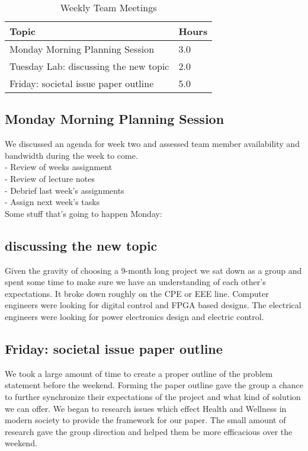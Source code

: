 \documentclass[12pt,article,compsoc]{IEEEtran}
\begin{document}
	
	\begin{table}[ht]
		\renewcommand{\arraystretch}{1.3}
			\caption{Weekly Team Meetings}
			
			\label{Team Hour Summary}
			
			\centering
			\begin{tabular}{p{7cm}|p{1cm}}
			\hline
			\bfseries 	Topic 										& \bfseries Hours\\
			\hline\hline
						Monday Morning Planning Session				& 3.0					\\
						Tuesday Lab: discussing the new topic 		& 2.0					\\	
						Friday: societal issue paper outline		& 5.0					\\	
			\hline
			\end{tabular}
		\end{table}
		 
	\subsection{Monday Morning Planning Session}
		We discussed an agenda for week two and assessed team member availability and bandwidth during the week to come. \\
		-	Review of weeks assignment				\\
		-	Review of lecture notes					\\
		-	Debrief last week’s assignments			\\
		-	Assign next week’s tasks				\\
		Some stuff that’s going to happen Monday:
		
	\subsection{discussing the new topic}
		Given the gravity of choosing a 9-month long project we sat down as a group and spent some time to make sure 
		we have an understanding of each other’s expectations. It broke down roughly on the CPE or EEE line. Computer 
		engineers were looking for digital control and FPGA based designs. The electrical engineers were looking for 
		power electronics design and electric control.  
		
	\subsection{Friday: societal issue paper outline}
		We took a large amount of time to create a proper outline of the problem statement before the weekend. 
		Forming the paper outline gave the group a chance to further synchronize their expectations of the project 
		and what kind of solution we can offer. We began to research issues which effect Health and Wellness in 
		modern society to provide the framework for our paper. The small amount of research gave the group direction 
		and helped them be more efficacious over the weekend. 
\end{document}
